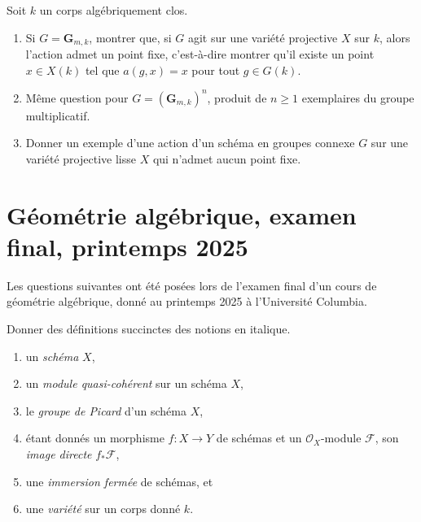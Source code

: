 \begin{exercise}
\label{exercise-fix-points}
Soit $k$ un corps algébriquement clos.
\begin{enumerate}
\item Si $G = \mathbf{G}_{m, k}$, montrer que, si $G$ agit sur une
variété projective $X$ sur $k$, alors l'action admet un point fixe, c'est-à-dire
montrer qu'il existe un point $x \in X(k)$ tel que $a(g, x) = x$ pour
tout $g \in G(k)$.
\item Même question pour $G = (\mathbf{G}_{m, k})^n$, produit de
$n \geq 1$ exemplaires du groupe multiplicatif.
\item Donner un exemple d'une action d'un schéma en groupes connexe $G$
sur une variété projective lisse $X$ qui n'admet aucun point fixe.
\end{enumerate}
\end{exercise}



\section{Géométrie algébrique, examen final, printemps 2025}
\label{section-final-exam-spring-2025}

\noindent
Les questions suivantes ont été posées lors de l'examen final d'un cours de géométrie algébrique,
donné au printemps 2025 à l'Université Columbia.

\begin{exercise}[Définitions]
\label{exercise-definitions-spring-2025}
Donner des définitions succinctes des notions en italique.
\begin{enumerate}
\item un {\it schéma} $X$,
\item un {\it module quasi-cohérent} sur un schéma $X$,
\item le {\it groupe de Picard} d'un schéma $X$,
\item étant donnés un morphisme $f : X \to Y$ de schémas et un
$\mathcal{O}_X$-module $\mathcal{F}$, son {\it image directe} $f_*\mathcal{F}$,
\item une {\it immersion fermée} de schémas, et
\item une {\it variété} sur un corps donné $k$.
\end{enumerate}
\end{exercise}

